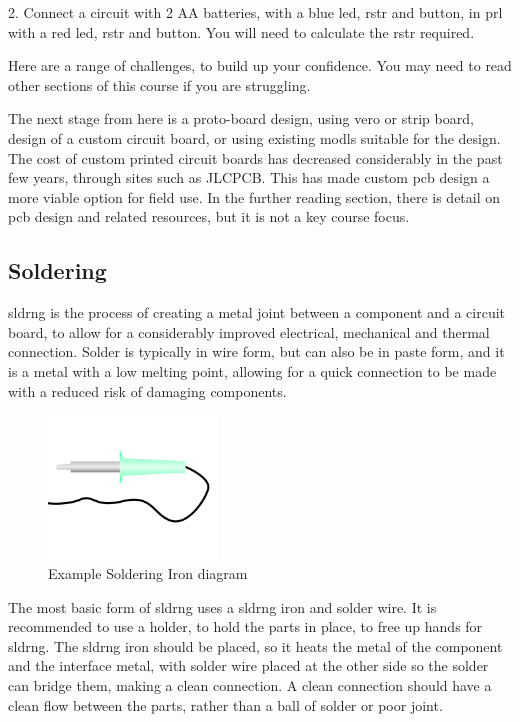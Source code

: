 \documentclass[a4paper,11pt]{report}
\begin{document}
2. Connect a circuit with 2 AA batteries, with a blue \gls{led}, \gls{rstr} and button, in \gls{prl} with a red \gls{led}, \gls{rstr} and button. You will need to calculate the \gls{rstr} required.

Here are a range of challenges, to build up your confidence. You may need to read other sections of this course if you are struggling.

The next stage from here is a proto-board design, using vero or strip board, design of a custom circuit board, or using existing \gls{modl}s suitable for the design. The cost of custom printed circuit boards has decreased considerably in the past few years, through sites such as JLCPCB. This has made custom \gls{pcb} design a more viable option for field use.
In the further reading section, there is detail on \gls{pcb} design and related resources, but it is not a key course focus.

\vspace*{1\baselineskip}

\subsection{Soldering}

\gls{sldrng} is the process of creating a metal joint between a component and a circuit board, to allow for a considerably improved electrical, mechanical and thermal connection. Solder is typically in wire form, but can also be in paste form, and it is a metal with a low melting point, allowing for a quick connection to be made with a reduced risk of damaging components.

\begin{figure}[H]
\centering
\includegraphics[width=0.4\textwidth]{solderingiron}
\caption{Example Soldering Iron diagram}
\end{figure}

The most basic form of \gls{sldrng} uses a \gls{sldrng} iron and solder wire. It is recommended to use a holder, to hold the parts in place, to free up hands for \gls{sldrng}. The \gls{sldrng} iron should be placed, so it heats the metal of the component and the interface metal, with solder wire placed at the other side so the solder can bridge them, making a clean connection. A clean connection should have a clean flow between the parts, rather than a ball of solder or poor joint.
\end{document}
